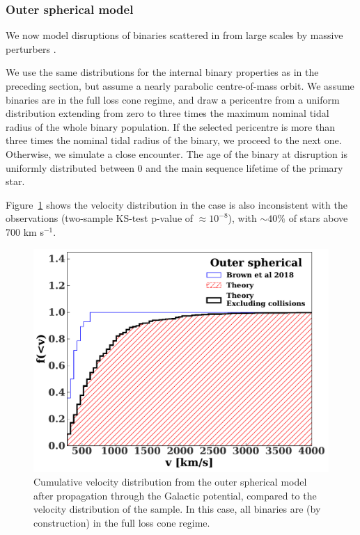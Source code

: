 \documentclass[fleqn,usenatbib]{mnras}
\begin{document}
\subsubsection{Outer spherical model}
We now model disruptions of binaries scattered in from large scales by massive perturbers \citep{perets+2007}. 

We use the same distributions for the internal binary properties as in the preceding section, but assume a nearly parabolic centre-of-mass orbit. We assume binaries are in the full loss cone regime, and draw a pericentre from a uniform distribution extending from zero to three times the maximum nominal tidal radius of the whole binary population. If the selected pericentre is more than three times the nominal tidal radius of the binary, we proceed to the next one. Otherwise, we simulate a close encounter. The age of the binary at disruption is uniformly distributed between 0 and the main sequence lifetime of the primary star.

Figure~\ref{fig:flc} shows the velocity distribution in the case is also inconsistent with the observations (two-sample KS-test p-value of $\approx10^{-8}$), with $\sim 40\%$ of stars above 700 km s$^{-1}$.

\begin{figure}
    \includegraphics[width=\columnwidth]{figures/vcomp_flc_tmin0.0.pdf}
    \caption{Cumulative velocity distribution from the outer spherical model after propagation through the Galactic potential, compared to the velocity distribution of the \citet{warren_brown+2018} sample. In this case, all binaries are (by construction) in the full loss cone regime.}
    \label{fig:flc}
\end{figure}
\end{document}
